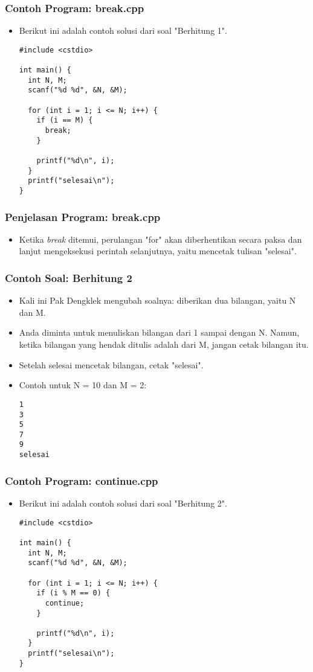 \begin{frame}[fragile]
\frametitle{Contoh Program: break.cpp}
\begin{itemize}
  \item Berikut ini adalah contoh solusi dari soal "Berhitung 1".
\begin{lstlisting}
#include <cstdio>

int main() {
  int N, M;
  scanf("%d %d", &N, &M);

  for (int i = 1; i <= N; i++) {
    if (i == M) {
      break;
    }

    printf("%d\n", i);
  }
  printf("selesai\n");
}
\end{lstlisting}
\end{itemize}
\end{frame}

\begin{frame}
\frametitle{Penjelasan Program: break.cpp}
\begin{itemize}
  \item Ketika \textit{break} ditemui, perulangan "for" akan diberhentikan secara paksa dan lanjut mengeksekusi perintah selanjutnya, yaitu mencetak tulisan "selesai".
\end{itemize}
\end{frame}

\begin{frame}[fragile]
\frametitle{Contoh Soal: Berhitung 2}
\begin{itemize}
  \item Kali ini Pak Dengklek mengubah soalnya: diberikan dua bilangan, yaitu N dan M.
  \item Anda diminta untuk menuliskan bilangan dari 1 sampai dengan N. Namun, ketika bilangan yang hendak ditulis adalah  dari M, jangan cetak bilangan itu.
  \item Setelah selesai mencetak bilangan, cetak "selesai".
  \item Contoh untuk N = 10 dan M = 2:
\begin{lstlisting}
1
3
5
7
9
selesai
\end{lstlisting}
\end{itemize}
\end{frame}

\begin{frame}[fragile]
\frametitle{Contoh Program: continue.cpp}
\begin{itemize}
  \item Berikut ini adalah contoh solusi dari soal "Berhitung 2".
\begin{lstlisting}
#include <cstdio>

int main() {
  int N, M;
  scanf("%d %d", &N, &M);

  for (int i = 1; i <= N; i++) {
    if (i % M == 0) {
      continue;
    }

    printf("%d\n", i);
  }
  printf("selesai\n");
}
\end{lstlisting}
\end{itemize}
\end{frame}


